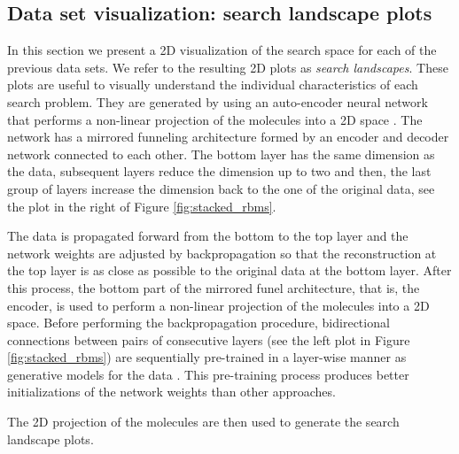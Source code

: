 \subsection{Data set visualization: search landscape plots}

In this section we present a 2D visualization of the search space for each of
the previous data sets. We refer to the resulting 2D plots as \emph{search
landscapes}. These plots are useful to visually understand the individual
characteristics of each search problem. They are generated by using an
auto-encoder neural network that performs a non-linear projection of the
molecules into a 2D space \cite{Hinton_2006}. The network has a mirrored
funneling architecture formed by an encoder and decoder network connected to
each other. The bottom layer has the same dimension as the data, subsequent
layers reduce the dimension up to two and then, the last group of layers
increase the dimension back to the one of the original data, see the plot in the
right of Figure \ref{fig:stacked_rbms}. 

The data is propagated forward from the bottom to the top layer and the network
weights are adjusted by backpropagation so that the reconstruction at the top
layer is as close as possible to the original data at the bottom layer. After
this process, the bottom part of the mirrored funel architecture, that is, the
encoder, is used to perform a non-linear projection of the molecules into a 2D
space. Before performing the backpropagation procedure, bidirectional
connections between pairs of consecutive layers (see the left plot in Figure
\ref{fig:stacked_rbms}) are sequentially pre-trained in a layer-wise manner as
generative models for the data \cite{Hinton_2006}. This pre-training process
produces better initializations of the network weights than other approaches.

The 2D projection of the molecules are then used to generate the search
landscape plots.

